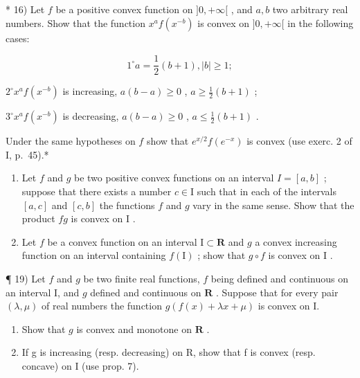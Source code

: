 * 16) Let \(f\) be a positive convex function on \(]0, +\infty[\) , and \(a, b\) two arbitrary real numbers. Show that the function \(x^a f(x^{-b})\) is convex on \(]0, +\infty[\) in the following cases:

\[
1 ^ {\circ} a = \frac {1}{2} (b + 1), | b | \geqslant 1;
\]

\(2^{\circ} x^{a} f(x^{-b})\) is increasing, \(a(b - a) \geqslant 0\) , \(a \geqslant \frac{1}{2}(b + 1)\) ;

\(3^{\circ} x^{a} f(x^{-b})\) is decreasing, \(a(b-a) \geqslant 0\) , \(a \leqslant \frac{1}{2}(b+1)\) .

Under the same hypotheses on \(f\) show that \(e^{x / 2}f(e^{-x})\) is convex (use exerc. 2 of I, p.~45).*

\begin{enumerate}
\def\labelenumi{\arabic{enumi})}
\setcounter{enumi}{16}
\item
  Let \(f\) and \(g\) be two positive convex functions on an interval \(I = [a, b]\) ; suppose that there exists a number \(c \in \mathrm{I}\) such that in each of the intervals \([a, c]\) and \([c, b]\) the functions \(f\) and \(g\) vary in the same sense. Show that the product \(fg\) is convex on \(\mathrm{I}\) .
\item
  Let \(f\) be a convex function on an interval \(\mathrm{I} \subset \mathbf{R}\) and \(g\) a convex increasing function on an interval containing \(f(\mathrm{I})\) ; show that \(g \circ f\) is convex on \(\mathrm{I}\) .
\end{enumerate}

¶ 19) Let \(f\) and \(g\) be two finite real functions, \(f\) being defined and continuous on an interval I, and \(g\) defined and continuous on \(\mathbf{R}\) . Suppose that for every pair \((\lambda, \mu)\) of real numbers the function \(g(f(x) + \lambda x + \mu)\) is convex on I.

\begin{enumerate}
\def\labelenumi{\alph{enumi})}
\item
  Show that \(g\) is convex and monotone on \(\mathbf{R}\) .
\item
  If g is increasing (resp. decreasing) on R, show that f is convex (resp. concave) on I (use prop. 7).
\end{enumerate}

